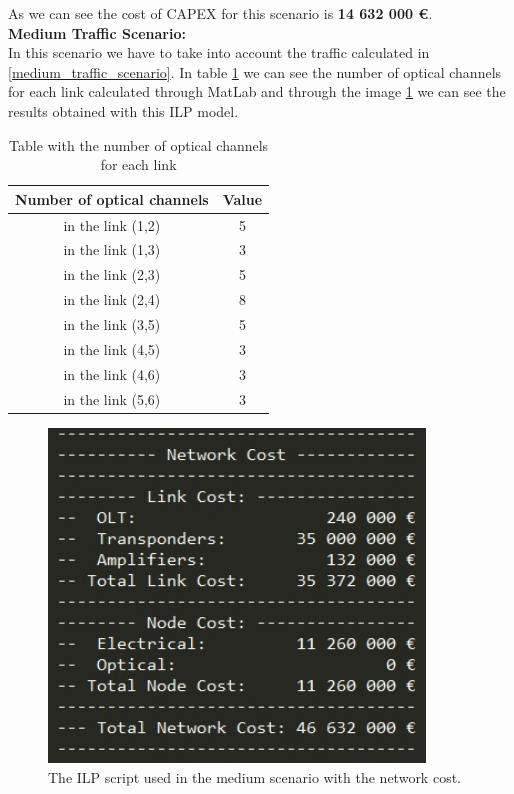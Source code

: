 As we can see the cost of CAPEX for this scenario is \textbf{14 632 000 \euro}.\\

\newpage
\textbf{Medium Traffic Scenario:}\\

In this scenario we have to take into account the traffic calculated in \ref{medium_traffic_scenario}. In table \ref{result_ILP2_reference} we can see the number of optical channels for each link calculated through MatLab and through the image \ref{scriptopaque_surv_ref_medium} we can see the results obtained with this ILP model.\\

\begin{table}[h!]
\centering
\begin{tabular}{|| c | c||}
 \hline
 Number of optical channels & Value \\
 \hline\hline
 in the link (1,2) & 5 \\
 in the link (1,3) & 3 \\
 in the link (2,3) & 5 \\
 in the link (2,4) & 8 \\
 in the link (3,5) & 5 \\
 in the link (4,5) & 3 \\
 in the link (4,6) & 3 \\
 in the link (5,6) & 3 \\
 \hline
\end{tabular}
\caption{Table with the number of optical channels for each link}
\label{result_ILP2_reference}
\end{table}


\begin{figure}[h!]
\centering
\includegraphics[width=10cm]{sdf/ilp/figures/script_opaque_surv_ref_medium}
\caption{The ILP script used in the medium scenario with the network cost.}
\label{scriptopaque_surv_ref_medium}
\end{figure}


